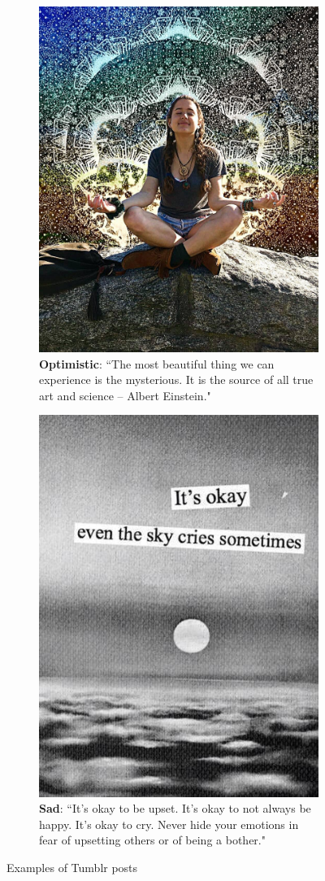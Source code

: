 \documentclass{article} %
\begin{document}
\begin{figure}[H]
    \begin{subfigure}[t]{.5\textwidth}
        \vskip 0pt %
        \centering
        \includegraphics[width=.2\linewidth]{Images/optimistic.jpg}
        \caption{\textbf{Optimistic}: ``The most beautiful thing we can experience is the mysterious. It is the source of all true art and science -- Albert Einstein."}
   \end{subfigure}
   \begin{subfigure}[t]{.5\textwidth}
       \vskip 0pt
       \centering
       \includegraphics[width=.2\linewidth]{Images/sad.jpg}
       \caption{\textbf{Sad}: ``It's okay to be upset. It's okay to not always be happy. It's okay to cry. Never hide your emotions in fear of upsetting others or of being a bother."}
    \end{subfigure}
    \caption{Examples of Tumblr posts}
    \label{fig:emotions}
\end{figure}
\end{document}
